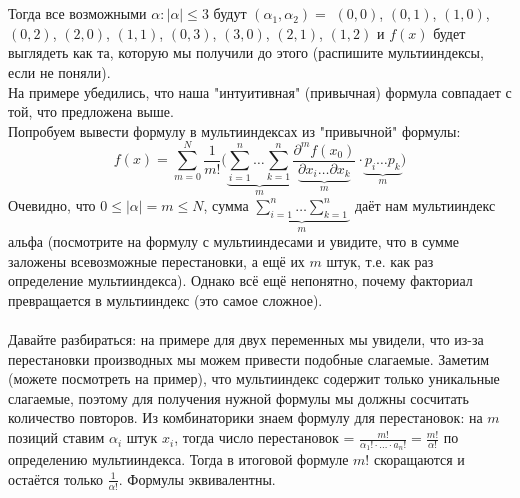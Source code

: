 \documentclass[book, 11pt]{report}
\begin{document}
{\begin{equation*}
        \end{equation*}
        \\
        \\
        Тогда все возможными $\alpha: |\alpha|\leq 3$ будут $(\alpha_1,\alpha_2)=$ $(0,0)$, $(0,1)$, $(1, 0)$, $(0,2)$, $(2, 0)$, $(1,1)$, $(0,3)$, $(3,0)$, $(2,1)$, $(1,2)$ и $f(x)$ будет выглядеть как та, которую мы получили до этого (распишите мультииндексы, если не поняли). \\
        На примере убедились, что наша "интуитивная" (привычная) формула совпадает с той, что предложена выше.\\
        Попробуем вывести формулу в мультииндексах из "привычной" формулы: 
        \begin{equation*}
            f(x)=\sum_{m=0}^N\frac{1}{m!}\bigg(\underbrace{\sum_{i=1}^n\ldots\sum_{k=1}^n}_{m}\frac{\partial^m f(x_0)}{\underbrace{\partial x_i\ldots\partial x_k}_{m}}\cdot \underbrace{p_i\ldots p_k}_{m}\bigg)
        \end{equation*}
        Очевидно, что $0\leq|\alpha| = m \leq N$, сумма $\underbrace{\sum_{i=1}^n\ldots\sum_{k=1}^n}_{m}$ даёт нам мультииндекс альфа (посмотрите на формулу с мультииндесами и увидите, что в сумме заложены всевозможные перестановки, а ещё их $m$ штук, т.е. как раз определение мультииндекса). Однако всё ещё непонятно, почему факториал превращается в мультииндекс (это самое сложное). \\ \\
        Давайте разбираться: на примере для двух переменных мы увидели, что из-за перестановки производных мы можем привести подобные слагаемые. Заметим (можете посмотреть на пример), что мультииндекс содержит только уникальные слагаемые, поэтому для получения нужной формулы мы должны сосчитать количество повторов. Из комбинаторики знаем формулу для перестановок: на $m$ позиций ставим $\alpha_i$ штук $x_i$, тогда число перестановок = $\frac{m!}{\alpha_1!\cdot\ldots\cdot a_n!}=\frac{m!}{\alpha!}$ по определению мультииндекса. Тогда в итоговой формуле $m!$ скоращаются и остаётся только $\frac{1}{\alpha!}$. Формулы эквивалентны.}
        \par
        \noindent\hrulefill\noindent
        \par{\ }
\end{document}
